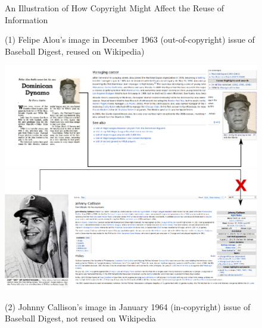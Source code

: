 \begin{figure}[!htbp]
\begin{center}
\caption{An Illustration of How Copyright Might Affect the Reuse of Information}
\label{fig:cover}
\vspace{5mm}
\caption*{(1) Felipe Alou's image in December 1963 (out-of-copyright) issue of Baseball Digest, reused on Wikipedia)}
\includegraphics[scale=1]{../tables/cover_bottom.png}
\vspace{2mm}
\caption*{(2) Johnny Callison's image in January 1964 (in-copyright) issue of Baseball Digest, not reused on Wikipedia}
\includegraphics[scale=1]{../tables/cover_top.png}

\end{center}
\begin{quote}
\vspace{5mm}
\end{quote}
\end{figure}

